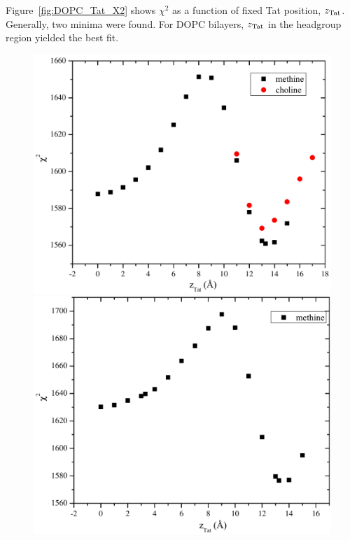Figure~\ref{fig:DOPC_Tat_X2} shows $\chi^2$ as a function of fixed Tat position, 
$z_\textrm{Tat}$. Generally, two minima were found. For DOPC bilayers, $z_\textrm{Tat}$ in the 
headgroup region yielded the best fit.
\begin{figure}[htbp]
  \centering
  \includegraphics[scale=0.3]{figures/Tat/SDP_Results/X2/DOPC_Tat_62to1_3p0_X2} 
  \includegraphics[scale=0.3]{figures/Tat/SDP_Results/X2/DOPC_Tat_28to1_3p0_X2} 

\end{figure}
